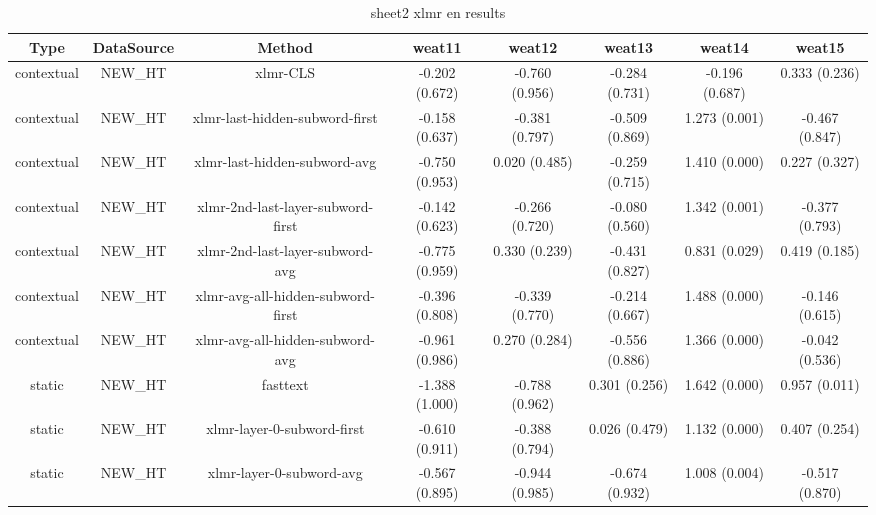 \begin{sidewaystable}[htb]
    \centering
    \caption{sheet2 xlmr en results}
    \label{appendix_tab:sheet2_xlmr_en_results}
    \small
    \begin{tabular}{@{}cccccccc@{}}
        \toprule
        Type & DataSource & Method & weat11 & weat12 & weat13 & weat14 & weat15 \\
        \midrule
        contextual & NEW\_HT & xlmr-CLS & -0.202 (0.672) & -0.760 (0.956) & -0.284 (0.731) & -0.196 (0.687) & 0.333 (0.236) \\
        contextual & NEW\_HT & xlmr-last-hidden-subword-first & -0.158 (0.637) & -0.381 (0.797) & -0.509 (0.869) & 1.273 (0.001) & -0.467 (0.847) \\
        contextual & NEW\_HT & xlmr-last-hidden-subword-avg & -0.750 (0.953) & 0.020 (0.485) & -0.259 (0.715) & 1.410 (0.000) & 0.227 (0.327) \\
        contextual & NEW\_HT & xlmr-2nd-last-layer-subword-first & -0.142 (0.623) & -0.266 (0.720) & -0.080 (0.560) & 1.342 (0.001) & -0.377 (0.793) \\
        contextual & NEW\_HT & xlmr-2nd-last-layer-subword-avg & -0.775 (0.959) & 0.330 (0.239) & -0.431 (0.827) & 0.831 (0.029) & 0.419 (0.185) \\
        contextual & NEW\_HT & xlmr-avg-all-hidden-subword-first & -0.396 (0.808) & -0.339 (0.770) & -0.214 (0.667) & 1.488 (0.000) & -0.146 (0.615) \\
        contextual & NEW\_HT & xlmr-avg-all-hidden-subword-avg & -0.961 (0.986) & 0.270 (0.284) & -0.556 (0.886) & 1.366 (0.000) & -0.042 (0.536) \\
        static & NEW\_HT & fasttext & -1.388 (1.000) & -0.788 (0.962) & 0.301 (0.256) & 1.642 (0.000) & 0.957 (0.011) \\
        static & NEW\_HT & xlmr-layer-0-subword-first & -0.610 (0.911) & -0.388 (0.794) & 0.026 (0.479) & 1.132 (0.000) & 0.407 (0.254) \\
        static & NEW\_HT & xlmr-layer-0-subword-avg & -0.567 (0.895) & -0.944 (0.985) & -0.674 (0.932) & 1.008 (0.004) & -0.517 (0.870) \\
        \bottomrule
    \end{tabular}
\end{sidewaystable}